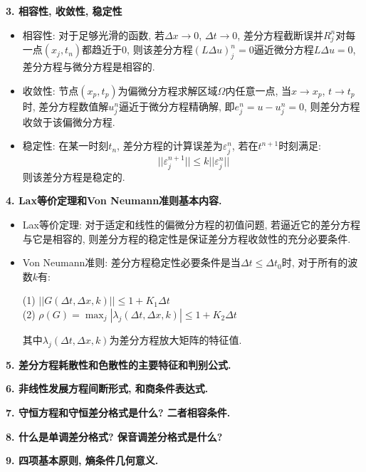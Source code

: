 \noindent \textbf{3. 相容性, 收敛性, 稳定性}
\begin{itemize}
\item 相容性: 对于足够光滑的函数, 若$\Delta x\rightarrow 0$, $\Delta t\rightarrow 0$, 差分方程截断误并$R_j^n$对每一点$(x_j, t_n)$都趋近于0, 则该差分方程$(L\Delta u)_j^n=0$逼近微分方程$L\Delta u=0$, 差分方程与微分方程是相容的. 
\item 收敛性: 节点$(x_p, t_p)$为偏微分方程求解区域$\Omega$内任意一点, 当$x\rightarrow x_p$, $t\rightarrow t_p$时, 差分方程数值解$u_j^n$逼近于微分方程精确解, 即$e_j^n=u-u_j^n=0$, 则差分方程收敛于该偏微分方程. 
\item 稳定性: 在某一时刻$t_n$, 差分方程的计算误差为$\varepsilon_j^n$, 若在$t^{n+1}$时刻满足:
    \[
    ||\varepsilon_j^{n+1}|| \leq k||\varepsilon_j^{n}||
    \]
    则该差分方程是稳定的.
\end{itemize}
\noindent \textbf{4. Lax等价定理和Von Neumann准则基本内容.}
\begin{itemize}
\item Lax等价定理: 对于适定和线性的偏微分方程的初值问题, 若逼近它的差分方程与它是相容的, 则差分方程的稳定性是保证差分方程收敛性的充分必要条件. 
\item Von Neumann准则: 差分方程稳定性必要条件是当$\Delta t\leq \Delta t_0$时, 对于所有的波数$k$有:
    
    (1) $||G(\Delta t, \Delta x, k)||\leq 1 + K_1 \Delta t$\\
    (2) $\rho(G)=\max_j|\lambda_j(\Delta t, \Delta x, k)|\leq 1 + K_2\Delta t$
    
其中$\lambda_j(\Delta t, \Delta x, k)$为差分方程放大矩阵的特征值.
\end{itemize}
\noindent \textbf{5. 差分方程耗散性和色散性的主要特征和判别公式.}

\noindent \textbf{6. 非线性发展方程间断形式, 和商条件表达式.}

\noindent \textbf{7. 守恒方程和守恒差分格式是什么? 二者相容条件.}

\noindent \textbf{8. 什么是单调差分格式? 保音调差分格式是什么?}

\noindent \textbf{9. 四项基本原则, 熵条件几何意义.}

